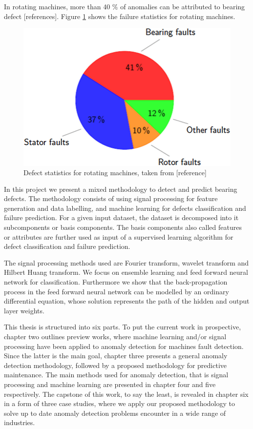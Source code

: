 \documentclass[11pt, oneside]{article}   	%
\begin{document}
\begin{flushleft}
In rotating machines, more than 40 $\%$ of anomalies can be attributed to bearing defect [references]. Figure \ref{fig:pie} shows the failure statistics for rotating machines. 
\end{flushleft}
\begin{figure}[H] %
   \centering
   \includegraphics[width=5in]{pie.png} 
   \caption{Defect statistics for rotating machines, taken from [reference]}
   \label{fig:pie}
\end{figure}
In this project we present a mixed methodology to detect and predict bearing defects. The methodology consists of using signal processing for feature generation and data labelling,  and machine learning for defects classification and failure prediction. For a given input dataset, the dataset is decomposed into it subcomponents or basis components. The basis components also called features or attributes are further used as input of a supervised learning algorithm for defect classification and failure prediction.
\begin{flushleft}
The signal processing methods used are Fourier transform, wavelet transform and Hilbert Huang transform. We focus on ensemble learning and feed forward neural network for classification. Furthermore we show that the back-propagation process in the feed forward neural network can be modelled by an ordinary differential equation, whose solution represents the path of the hidden and output layer weights.
\end{flushleft}
\justify
This thesis is structured into six parts. To put the current work in prospective, chapter two outlines preview works, where machine learning and/or signal processing have been applied to anomaly detection for machines fault detection. Since the latter is the main goal, chapter three presents a general anomaly detection methodology, followed by a proposed methodology for predictive maintenance. The main methods used for anomaly detection, that is signal processing and machine learning are presented in chapter four and five respectively. The capstone of this work, to say the least, is revealed in chapter six in a form of three case studies, where we apply our proposed methodology to solve up to date anomaly detection problems encounter in a wide range of industries.
\end{document}
